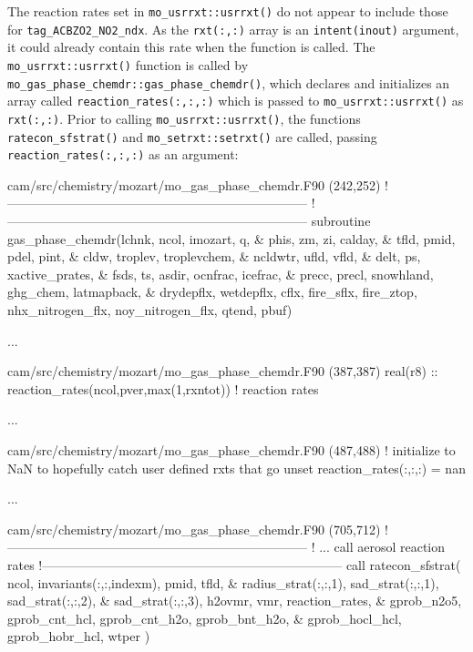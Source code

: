 \documentclass[titlepage]{article}
\begin{document}
The reaction rates set in \verb>mo_usrrxt::usrrxt()> do not appear to include those for \verb>tag_ACBZO2_NO2_ndx>. As the \verb>rxt(:,:)> array is an \verb>intent(inout)> argument, it could already contain this rate when the function is called. The \verb>mo_usrrxt::usrrxt()> function is called by \verb>mo_gas_phase_chemdr::gas_phase_chemdr()>, which declares and initializes an array called \verb>reaction_rates(:,:,:)> which is passed to \verb>mo_usrrxt::usrrxt()> as \verb>rxt(:,:)>. Prior to calling \verb>mo_usrrxt::usrrxt()>, the functions \verb>ratecon_sfstrat()> and \verb>mo_setrxt::setrxt()> are called, passing \verb>reaction_rates(:,:,:)> as an argument:

\begin{blockcode}[commandchars=\\\{\}]
\color{gray}cam/src/chemistry/mozart/mo_gas_phase_chemdr.F90 (242,252)
!-----------------------------------------------------------------------
!-----------------------------------------------------------------------
  subroutine gas_phase_chemdr(lchnk, ncol, imozart, q, &
                              phis, zm, zi, calday, &
                              tfld, pmid, pdel, pint,  &
                              cldw, troplev, troplevchem, &
                              ncldwtr, ufld, vfld,  &
                              delt, ps, xactive_prates, &
                              fsds, ts, asdir, ocnfrac, icefrac, &
                              precc, precl, snowhland, ghg_chem, latmapback, &
                              drydepflx, wetdepflx, cflx, fire_sflx, fire_ztop, nhx_nitrogen_flx, noy_nitrogen_flx, qtend, pbuf)

\color{gray}...

\color{gray}cam/src/chemistry/mozart/mo_gas_phase_chemdr.F90 (387,387)
    real(r8)     ::  reaction_rates(ncol,pver,max(1,rxntot))      ! reaction rates

\color{gray}...

\color{gray}cam/src/chemistry/mozart/mo_gas_phase_chemdr.F90 (487,488)
    ! initialize to NaN to hopefully catch user defined rxts that go unset
    reaction_rates(:,:,:) = nan

\color{gray}...

\color{gray}cam/src/chemistry/mozart/mo_gas_phase_chemdr.F90 (705,712)
       !-----------------------------------------------------------------------
       !        ... call aerosol reaction rates
       !-----------------------------------------------------------------------
       call ratecon_sfstrat( ncol, invariants(:,:,indexm), pmid, tfld, &
            radius_strat(:,:,1), sad_strat(:,:,1), sad_strat(:,:,2), &
            sad_strat(:,:,3), h2ovmr, vmr, reaction_rates, &
            gprob_n2o5, gprob_cnt_hcl, gprob_cnt_h2o, gprob_bnt_h2o, &
            gprob_hocl_hcl, gprob_hobr_hcl, wtper )


\end{blockcode}
\end{document}
